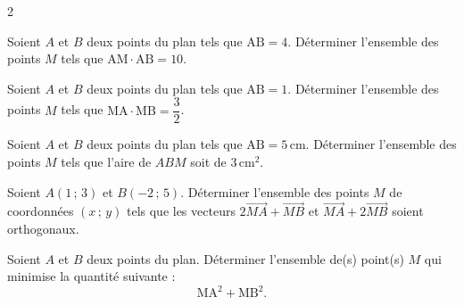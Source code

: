 \documentclass[a4paper,12pt]{article}
\begin{document}
\begin{multicols}{2}
\begin{exercice}[title=Exercice 18 $\star\star$ { [Chercher, Représenter, Calculer] }]{}{}
  Soient $A$ et $B$ deux points du plan tels que $\mathrm{AB} = 4$. Déterminer l'ensemble des points $M$ tels que $\mathrm{AM}\cdot\mathrm{AB} = 10$.
\end{exercice}

\begin{exercice}[title=Exercice 19 $\star\star$ { [Chercher, Représenter, Calculer] }]{}{}
  Soient $A$ et $B$ deux points du plan tels que $\mathrm{AB} = 1$. Déterminer l'ensemble des points $M$ tels que $\mathrm{MA}\cdot\mathrm{MB} = \dfrac{3}{2}$.
\end{exercice}

\begin{exercice}[title=Exercice 20 $\star\star$ { [Chercher, Représenter, Calculer] }]{}{}
  Soient $A$ et $B$ deux points du plan tels que $\mathrm{AB} = 5\,\text{cm}$. Déterminer l'ensemble des points $M$ tels que l'aire de $ABM$ soit de $3\,\text{cm}^2$.
\end{exercice}

\begin{exercice}[title=Exercice 21 $\star\star$ { [Représenter, Calculer] }]{}{}
  Soient $A(1\,;\,3)$ et $B(-2\,;\,5)$. Déterminer l'ensemble des points $M$ de coordonnées $(x\,;\,y)$ tels que les vecteurs $2\overrightarrow{MA} + \overrightarrow{MB}$ et $\overrightarrow{MA} + 2\overrightarrow{MB}$ soient orthogonaux.
\end{exercice}

\begin{exercice}[title=Exercice 22 $\star\star\star$ { [Chercher, Calculer] }]{}{}
  Soient $A$ et $B$ deux points du plan. Déterminer l'ensemble de(s) point(s) $M$ qui minimise la quantité suivante :
  $$\mathrm{MA}^2 + \mathrm{MB}^2.$$
\end{exercice}


\end{multicols}
\end{document}
